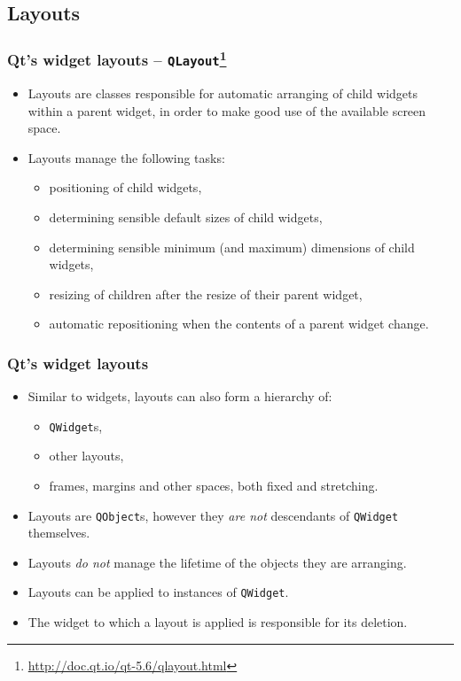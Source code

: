 \subsection{Layouts}

\begin{frame}
  \frametitle{Qt's widget layouts -- \texttt{QLayout}\footnote
    {\url{http://doc.qt.io/qt-5.6/qlayout.html}}}
  \begin{itemize}
    \item Layouts are classes responsible for automatic arranging of
    child widgets within a parent widget, in order to make good
    use of the available screen space.
    \item Layouts manage the following tasks:
    \begin{itemize}
      \item positioning of child widgets,
      \item determining sensible default sizes of child widgets,
      \item determining sensible minimum (and maximum) dimensions of child widgets,
      \item resizing of children after the resize of their parent widget,
      \item automatic repositioning when the contents of a parent widget change.
    \end{itemize}
  \end{itemize}
\end{frame}

\begin{frame}
  \frametitle{Qt's widget layouts}
  \begin{itemize}
    \item Similar to widgets, layouts can also form a hierarchy of:
    \begin{itemize}
      \item \texttt{QWidget}s,
      \item other layouts,
      \item frames, margins and other  spaces, both fixed and stretching.
    \end{itemize}
    \item Layouts are \texttt{QObject}s, however they {\em are not} descendants
     of \texttt{QWidget} themselves.
    \item Layouts {\em do not} manage the lifetime of the objects they are
      arranging.
    \item Layouts can be applied to instances of \texttt{QWidget}.
    \item The widget to which a layout is applied is responsible for its deletion.
  \end{itemize}
\end{frame}

